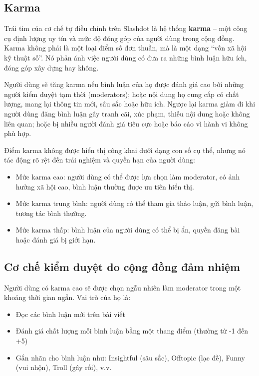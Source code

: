\subsection{Karma}

Trái tim của cơ chế tự điều chỉnh trên Slashdot là hệ thống \textbf{karma} \cite{mechanisms-of-website-slashdot} -- một công cụ định lượng uy tín và mức độ đóng góp của người dùng trong cộng đồng.
Karma không phải là một loại điểm số đơn thuần, mà là một dạng ``vốn xã hội kỹ thuật số''. Nó phản ánh việc người dùng có đưa ra những bình luận hữu ích, đóng góp xây dựng hay không.

Người dùng sẽ tăng karma nếu bình luận của họ được đánh giá cao bởi những người kiểm duyệt tạm thời (moderators); hoặc nội dung họ cung cấp có chất lượng, mang lại thông tin mới, sâu sắc hoặc hữu ích.
Ngược lại karma giảm đi khi người dùng đăng bình luận gây tranh cãi, xúc phạm, thiếu nội dung hoặc không liên quan; hoặc bị nhiều người đánh giá tiêu cực hoặc báo cáo vì hành vi không phù hợp.

Điểm karma không được hiển thị công khai dưới dạng con số cụ thể, nhưng nó tác động rõ rệt đến trải nghiệm và quyền hạn của người dùng:
\begin{itemize}
  \item Mức karma cao: người dùng có thể được lựa chọn làm moderator, có ảnh hưởng xã hội cao, bình luận thường được ưu tiên hiển thị.
  \item Mức karma trung bình: người dùng có thể tham gia thảo luận, gửi bình luận, tương tác bình thường.
  \item Mức karma thấp: bình luận của người dùng có thể bị ẩn, quyền đăng bài hoặc đánh giá bị giới hạn.
\end{itemize}

\subsection{Cơ chế kiểm duyệt do cộng đồng đảm nhiệm}

Người dùng có karma cao sẽ được chọn ngẫu nhiên làm moderator trong một khoảng thời gian ngắn. Vai trò của họ là:
\begin{itemize}
  \item Đọc các bình luận mới trên bài viết
  \item Đánh giá chất lượng mỗi bình luận bằng một thang điểm (thường từ -1 đến +5)
  \item Gắn nhãn cho bình luận như: Insightful (sâu sắc), Offtopic (lạc đề), Funny (vui nhộn), Troll (gây rối), v.v.
\end{itemize}

